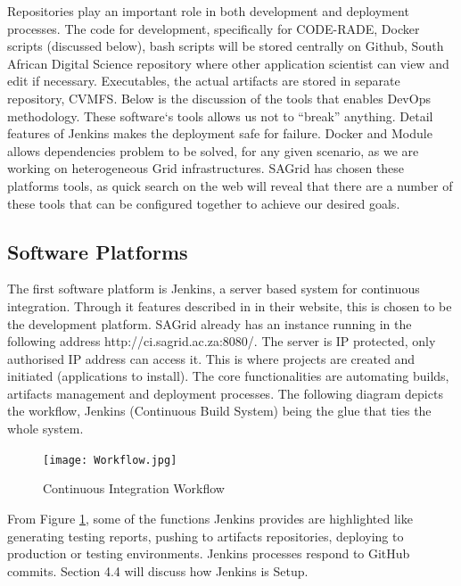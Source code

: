 \documentclass [titlepage,11pt]{article}
\begin{document}
Repositories play an important role in both development and deployment processes. The code for development, specifically for CODE-RADE, Docker scripts (discussed below), bash scripts will be stored centrally on Github, South African Digital Science repository \citep{github} where other application scientist can view and edit if necessary. Executables, the actual artifacts are stored in separate repository, CVMFS. Below is the discussion of the tools that enables DevOps methodology. These software`s tools allows us not to ``break'' anything. Detail features of Jenkins makes the deployment safe for failure. Docker and Module allows dependencies problem to be solved, for any given scenario, as we are working on heterogeneous Grid infrastructures. SAGrid has chosen these platforms tools, as quick search on the web will reveal that there are a number of these tools that can be configured together to achieve our desired goals. \\

\subsection{Software Platforms}
The first software platform is Jenkins, a server based system for continuous integration. Through it features described in \citep{jenkins15} in their website, this is chosen to be the development platform. SAGrid already has an instance running in the following address http://ci.sagrid.ac.za:8080/. The server is IP protected, only authorised IP address can access it.  This is where projects are created and initiated (applications to install). The core functionalities are automating builds, artifacts management and deployment processes. The following diagram depicts the workflow, Jenkins (Continuous Build System) being the glue that ties the whole system.

\begin{figure}[!hb]
\centering
\texttt{[image: Workflow.jpg]}
\caption{Continuous Integration Workflow}
\label{fig:workflow}
\end{figure}

From Figure \ref{fig:workflow}, some of the functions Jenkins provides are highlighted like generating testing reports, pushing to artifacts repositories, deploying to production or testing environments. Jenkins processes respond to GitHub commits. Section 4.4 will discuss how Jenkins is Setup. \\
\end{document}
